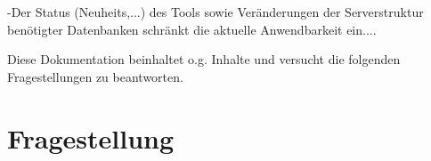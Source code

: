 \documentclass[
a4paper,     %
12pt         %
]{scrartcl}  %
\begin{document}
-Der Status (Neuheits,...) des Tools sowie Veränderungen der Serverstruktur benötigter Datenbanken schränkt die aktuelle Anwendbarkeit ein....

Diese Dokumentation beinhaltet o.g. Inhalte und versucht die folgenden Fragestellungen zu beantworten.  

\section{Fragestellung} %




%
\end{document}
